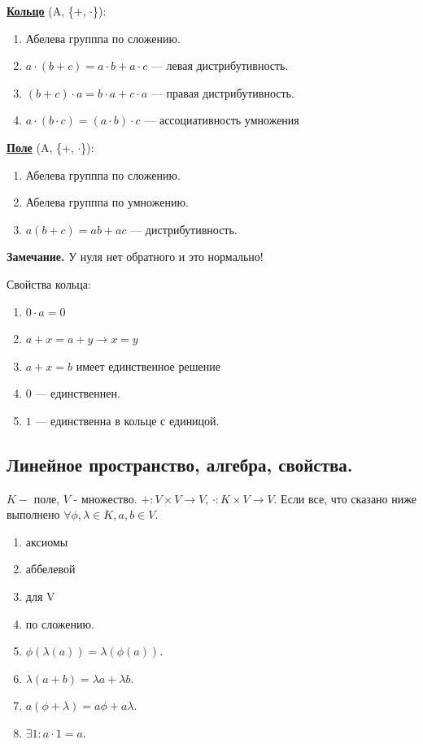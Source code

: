 \documentclass[twoside]{book}
\newcommand{\deff}[1]{\underline{\textbf{#1}}}
\begin{document}
\deff{Кольцо} (A, \{+, $\cdot$\}):

\begin{enumerate}
    \item Абелева групппа по сложению.
    \item $a \cdot (b+c) = a\cdot b + a\cdot c$ --- левая дистрибутивность.
    \item $(b+c)\cdot a  = b \cdot a + c \cdot a$  --- правая дистрибутивность.
    \item $a \cdot (b\cdot c) = (a\cdot b)\cdot c$ --- ассоциативность умножения
\end{enumerate}

\deff{Поле}  (A, \{+, $\cdot$\}):
\begin{enumerate}
    \item Абелева групппа по сложению.
    \item Абелева групппа по умножению.
    \item $a(b+c) = ab+ac$ --- дистрибутивность.
\end{enumerate}

\textbf{Замечание.} У нуля нет обратного и это нормально!

Свойства кольца:

\begin{enumerate}
    \item $0 \cdot a = 0$
    \item $a+x = a+ y \rightarrow x=y$
    \item $a + x = b$ имеет единственное решение
    \item $0$ --- единственнен.
    \item $1$ --- единственна в кольце с единицой.
\end{enumerate}

\subsection{Линейное пространство, алгебра, свойства.}

$K - $ поле, $V$ - множество. $+: V \times V \rightarrow V$, $\cdot: K\times V \rightarrow V$. Если все, что сказано ниже выполнено  $\forall \phi, \lambda \in K, a,b \in V$.

\begin{enumerate}
    \item аксиомы
    \item аббелевой
    \item для V
    \item по сложению.
    \item $ \phi(\lambda(a)) = \lambda(\phi(a))$.
    \item $\lambda (a+b) = \lambda a + \lambda b$.
    \item $a ( \phi + \lambda) = a\phi + a \lambda $.
    \item $\exists 1: a \cdot 1 =a$.
\end{enumerate}
\end{document}
